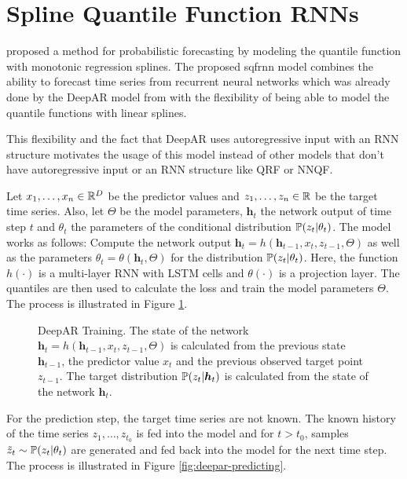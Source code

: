 \section{Spline Quantile Function RNNs}
\label{sec:sqf-rnn}

\Textcite{Gasthaus2019} proposed a method for probabilistic forecasting by modeling 
the quantile function with monotonic regression splines. 
The proposed \gls{sqfrnn} model combines the ability to forecast time series 
from recurrent neural networks which was already done by the DeepAR model from \Textcite{Salinas2017}
with the flexibility of being able to 
model the quantile functions with linear splines. 

This flexibility and the fact that DeepAR uses autoregressive input with an RNN structure 
motivates the usage of this model instead of other models that don't 
have autoregressive input or an RNN structure like QRF or NNQF.

Let \(x_1, \ldots, x_n \in \R^D\) be the predictor values and 
\(z_1, \ldots, z_n \in \R\) be the target time series. Also, let \(\Theta\) 
be the model parameters, \(\boldsymbol{h}_t\) the network output of 
time step \(t\) and \(\theta_t\) the parameters of the conditional distribution \(\P(z_t | \theta_t)\).
The model works as follows:
Compute the network output \(\boldsymbol{h}_t = h(\boldsymbol{h}_{t-1}, x_t, z_{t-1}, \Theta)\) 
as well as the parameters \(\theta_t = \theta(\boldsymbol{h}_t, \Theta)\) for the distribution
\(\P(z_t | \theta_t)\). Here, the function \(h(\cdot)\) is a multi-layer RNN with 
LSTM cells and \(\theta(\cdot)\) is a projection layer. 
The quantiles are then used to calculate the loss and train the model parameters \(\Theta\).
The process is illustrated in Figure \ref{fig:deepar-training}. 

\begin{figure}[h]%
    \centering
    
    \caption[DeepAR Training]{DeepAR Training. 
    The state of the network \(\boldsymbol{h}_t = h(\boldsymbol{h}_{t-1}, x_t, z_{t-1}, \Theta)\) 
    is calculated from the previous state \(\boldsymbol{h}_{t-1}\), 
    the predictor value \(x_t\) and the previous observed target point \(z_{t-1}\). 
    The target distribution \(\P(z_t | \boldsymbol{h}_t)\) 
    is calculated from the state of the network \(\boldsymbol{h}_t\).}%
    \label{fig:deepar-training}%
\end{figure}

For the prediction step, the target time series are not known. 
The known history of the time series \(z_1, \ldots, z_{t_0}\) is fed into the 
model and for \(t > t_0\), samples \(\tilde{z}_t \sim \P(z_t | \theta_t)\) 
are generated and fed back into the model for the next time step.
The process is illustrated in Figure \ref{fig:deepar-predicting}.

